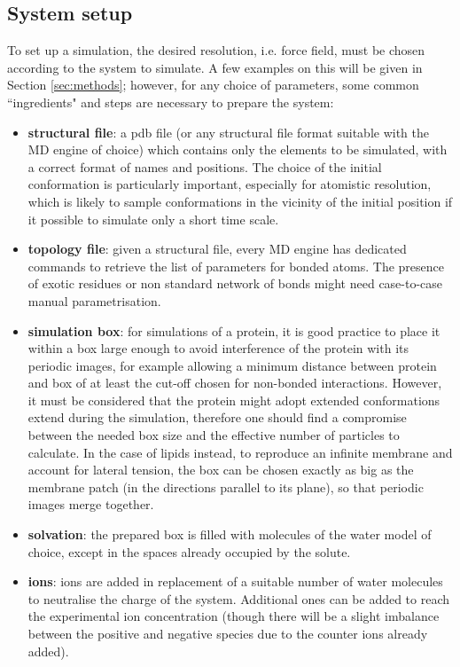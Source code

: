 \documentclass[graybox]{svmult}
\begin{document}
\subsection{System setup}
To set up a simulation, the desired resolution, i.e. force field, must be chosen according to the system to simulate. A few examples on this will be given in Section \ref{sec:methods}; however, for any choice of parameters, some common ``ingredients" and steps are necessary to prepare the system:
\begin{itemize}
\item \textbf{structural file}: a pdb file (or any structural file format suitable with the MD engine of choice) which contains only the elements to be simulated, with a correct format of names and positions. The choice of the initial conformation is particularly important, especially for atomistic resolution, which is likely to sample conformations in the vicinity of the initial position if it possible to simulate only a short time scale.
\item \textbf{topology file}: given a structural file, every MD engine has dedicated commands to retrieve the list of parameters for bonded atoms. The presence of exotic residues or non standard network of bonds might need case-to-case manual parametrisation.
\item \textbf{simulation box}: for simulations of a protein, it is good practice to place it within a box large enough to avoid interference of the protein with its periodic images, for example allowing a minimum distance between protein and box of at least the cut-off chosen for non-bonded interactions. However, it must be considered that the protein might adopt extended conformations extend during the simulation, therefore one should find a compromise between the needed box size and the effective number of particles to calculate.
%
In the case of lipids instead, to reproduce an infinite membrane and account for lateral tension, the box can be chosen exactly as big as the membrane patch (in the directions parallel to its plane), so that periodic images merge together.
\item \textbf{solvation}: the prepared box is filled with molecules of the water model of choice, except in the spaces already occupied by the solute.
\item \textbf{ions}: ions are added in replacement of a suitable number of water molecules to neutralise the charge of the system. Additional ones can be added to reach the experimental ion concentration (though there will be a slight imbalance between the positive and negative species due to the counter ions already added).

\end{itemize}
\end{document}
